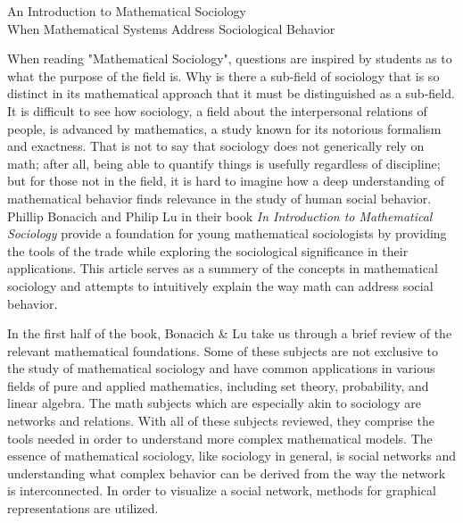 \documentclass{article}
\begin{document}
    \renewcommand{\headrulewidth}{0pt} %
    \thispagestyle{firstpage} %
    
    \begin{center}
        An Introduction to Mathematical Sociology \\ When Mathematical Systems Address Sociological Behavior 
    \end{center}
    
    \hspace{20pt} When reading "Mathematical Sociology", questions are inspired by students as to what the purpose of the field is. Why is there a sub-field of sociology that is so distinct in its mathematical approach that it must be distinguished as a sub-field. It is difficult to see how sociology, a field about the interpersonal relations of people, is advanced by mathematics, a study known for its notorious formalism and exactness. That is not to say that sociology does not generically rely on math; after all, being able to quantify things is usefully regardless of discipline; but for those not in the field, it is hard to imagine how a deep understanding of mathematical behavior finds relevance in the study of human social behavior. Phillip Bonacich and Philip Lu in their book {\em \large In Introduction to Mathematical Sociology} provide a foundation for young mathematical sociologists by providing the tools of the trade while exploring the sociological significance in their applications. This article serves as a summery of the concepts in mathematical sociology and attempts to intuitively explain the way math can address social behavior.
    
    \hspace{20pt} In the first half of the book, Bonacich \& Lu take us through a brief review of the relevant mathematical foundations. Some of these subjects are not exclusive to the study of mathematical sociology and have common applications in various fields of pure and applied mathematics, including set theory, probability, and linear algebra. The math subjects which are especially akin to sociology are networks and relations. With all of these subjects reviewed, they comprise the tools needed in order to understand more complex mathematical models. The essence of mathematical sociology, like sociology in general, is social networks and understanding what complex behavior can be derived from the way the network is interconnected. In order to visualize a social network, methods for graphical representations are utilized.
    
\end{document}
